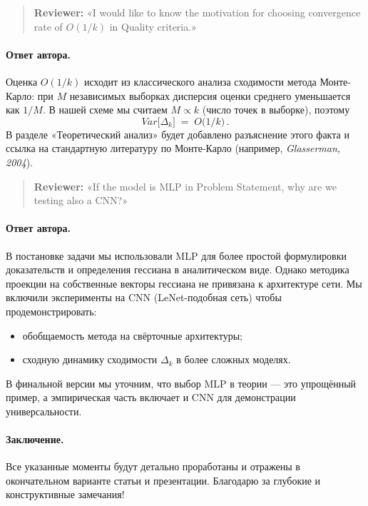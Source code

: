 \documentclass[11pt]{article}
\begin{document}
\begin{quote}
    \textbf{Reviewer:}
    «I would like to know the motivation for choosing convergence rate of \(O(1/k)\) in Quality criteria.»
\end{quote}

\paragraph{Ответ автора.}
Оценка \(O(1/k)\) исходит из классического анализа сходимости метода Монте-Карло: при \(M\) независимых выборках дисперсия оценки среднего уменьшается как \(1/M\). В нашей схеме мы считаем \(M\propto k\) (число точек в выборке), поэтому
\[
    Var\bigl[\Delta_k\bigr] \;=\; O\bigl(1/k\bigr)\,.
\]
В разделе «Теоретический анализ» будет добавлено разъяснение этого факта и ссылка на стандартную литературу по Монте-Карло (например, \emph{Glasserman, 2004}).

\begin{quote}
    \textbf{Reviewer:}
    «If the model is MLP in Problem Statement, why are we testing also a CNN?»
\end{quote}

\paragraph{Ответ автора.}
В постановке задачи мы использовали MLP для более простой формулировки доказательств и определения гессиана в аналитическом виде. Однако методика проекции на собственные векторы гессиана не привязана к архитектуре сети. Мы включили эксперименты на CNN (LeNet-подобная сеть) чтобы продемонстрировать:
\begin{itemize}
    \item обобщаемость метода на свёрточные архитектуры;
    \item сходную динамику сходимости \(\Delta_k\) в более сложных моделях.
\end{itemize}
В финальной версии мы уточним, что выбор MLP в теории — это упрощённый пример, а эмпирическая часть включает и CNN для демонстрации универсальности.

\paragraph{Заключение.}
Все указанные моменты будут детально проработаны и отражены в окончательном варианте статьи и презентации. Благодарю за глубокие и конструктивные замечания!
\end{document}
